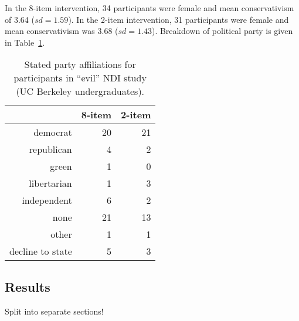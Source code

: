 In the 8-item intervention, 34 participants were female and mean conservativism
of 3.64 ($sd=1.59$). In the 2-item intervention, 31 participants were female and
mean conservativism was 3.68 ($sd=1.43$). Breakdown of political party is given
in Table~\ref{table:evil-party}.

\begin{table}[ht]
\caption{Stated party affiliations for participants in “evil” NDI study (UC
    Berkeley undergraduates).}
\label{table:evil-party}
\centering
\begin{tabular}{rrr}
  \toprule
     & 8-item & 2-item \\ 
  \midrule
  democrat &  20 &  21 \\ 
  republican &   4 &   2 \\ 
  green &   1 &   0 \\ 
  libertarian &   1 &   3 \\ 
  independent &   6 &   2 \\ 
  none &  21 &  13 \\ 
  other &   1 &   1 \\ 
  decline to state &   5 &   3 \\ 
   \bottomrule
\end{tabular}
\end{table}
\subsection{Results}

Split into separate sections! 

